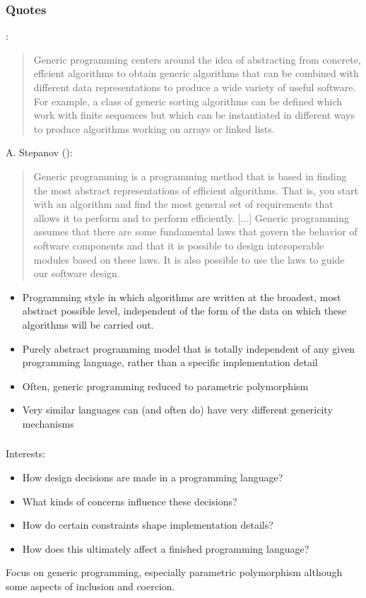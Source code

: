 \documentclass[draft]{beamer}
\begin{document}
\begin{frame}[allowframebreaks]
\frametitle{Quotes}
\cite{goos_generic_1989}:
\begin{quote}
 Generic programming centers around the idea of abstracting from concrete, effcient algorithms to obtain generic algorithms that can be combined with different data representations to produce a wide variety of useful software.
 For example, a class of generic sorting algorithms can be defined which work with finite sequences but which can be instantiated in different ways to produce algorithms working on arrays or linked lists.
\end{quote}
\newpage
A. Stepanov (\cite{lo_russo_stlport:_1997}):
\begin{quote}
 Generic programming is a programming method that is based in finding the most abstract representations of efficient algorithms.
 That is, you start with an algorithm and find the most general set of requirements that allows it to perform and to perform efficiently.
 [...]
 Generic programming assumes that there are some fundamental laws that govern the behavior of software components and that it is possible to design interoperable modules based on these laws.
 It is also possible to use the laws to guide our software design.
\end{quote}
\newpage
\cite{giovannelli_programming_2013}
\begin{itemize}
 \item Programming style in which algorithms are written at the broadest, most abstract possible level, independent of the form of the data on which these algorithms will be carried out.
 \item Purely abstract programming model that is totally independent of any given programming language, rather than a specific implementation detail
 \item Often, generic programming reduced to parametric polymorphism
 \item Very similar languages can (and often do) have very different genericity mechanisms
\end{itemize}
\end{frame}

\begin{frame}
\frametitle{\cite{giovannelli_programming_2013}}
Interests:
\begin{itemize}
 \item How design decisions are made in a programming language?
 \item What kinds of concerns influence these decisions?
 \item How do certain constraints shape implementation details?
 \item How does this ultimately affect a finished programming language?
\end{itemize}
Focus on generic programming, especially parametric polymorphism although some aspects of inclusion and coercion.
\end{frame}
\end{document}
